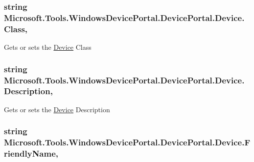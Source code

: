 \subsubsection[{\texorpdfstring{Class}{Class}}]{\setlength{\rightskip}{0pt plus 5cm}string Microsoft.\+Tools.\+Windows\+Device\+Portal.\+Device\+Portal.\+Device.\+Class\hspace{0.3cm}{\ttfamily [get]}, {\ttfamily [set]}}\hypertarget{class_microsoft_1_1_tools_1_1_windows_device_portal_1_1_device_portal_1_1_device_a62766ef1cb0a94d5067fc77b64138b34}{}\label{class_microsoft_1_1_tools_1_1_windows_device_portal_1_1_device_portal_1_1_device_a62766ef1cb0a94d5067fc77b64138b34}


Gets or sets the \hyperlink{class_microsoft_1_1_tools_1_1_windows_device_portal_1_1_device_portal_1_1_device}{Device} Class 

\subsubsection[{\texorpdfstring{Description}{Description}}]{\setlength{\rightskip}{0pt plus 5cm}string Microsoft.\+Tools.\+Windows\+Device\+Portal.\+Device\+Portal.\+Device.\+Description\hspace{0.3cm}{\ttfamily [get]}, {\ttfamily [set]}}\hypertarget{class_microsoft_1_1_tools_1_1_windows_device_portal_1_1_device_portal_1_1_device_addc8d55d1c5fbc9f64526815b30aa9fb}{}\label{class_microsoft_1_1_tools_1_1_windows_device_portal_1_1_device_portal_1_1_device_addc8d55d1c5fbc9f64526815b30aa9fb}


Gets or sets the \hyperlink{class_microsoft_1_1_tools_1_1_windows_device_portal_1_1_device_portal_1_1_device}{Device} Description 

\subsubsection[{\texorpdfstring{Friendly\+Name}{FriendlyName}}]{\setlength{\rightskip}{0pt plus 5cm}string Microsoft.\+Tools.\+Windows\+Device\+Portal.\+Device\+Portal.\+Device.\+Friendly\+Name\hspace{0.3cm}{\ttfamily [get]}, {\ttfamily [set]}}\hypertarget{class_microsoft_1_1_tools_1_1_windows_device_portal_1_1_device_portal_1_1_device_ae01a12018cdb342f194fe6279a30b915}{}\label{class_microsoft_1_1_tools_1_1_windows_device_portal_1_1_device_portal_1_1_device_ae01a12018cdb342f194fe6279a30b915}



